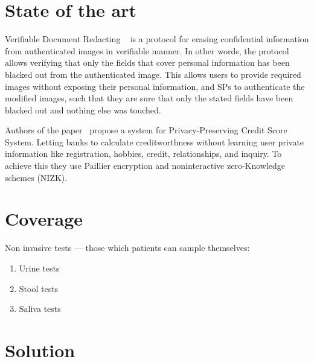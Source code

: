 \documentclass{article}
\begin{document}
\section{State of the art}

Verifiable Document Redacting ~\cite{chabanne2017verifiable} is a protocol for erasing confidential information from authenticated images in verifiable manner. In other words, the protocol allows verifying that only the fields that cover personal information has been blacked out from the authenticated image. This allows users to provide required images without exposing their personal information, and SPs to authenticate the modified images, such that they are sure that only the stated fields have been blacked out and nothing else was touched. 

Authors of the paper~\cite{lin2021efficient} propose a system for Privacy-Preserving Credit Score System. Letting banks to calculate creditworthness without learning user private information like registration, hobbies, credit, relationships, and inquiry. To achieve this they use Paillier encryption and noninteractive zero-Knowledge schemes (NIZK).

\section{Coverage}

Non invasive tests — those which patients can sample themselves: 
\begin{enumerate}
    \item Urine tests
    \item Stool tests
    \item Saliva tests
\end{enumerate}

\section{Solution}
\end{document}
